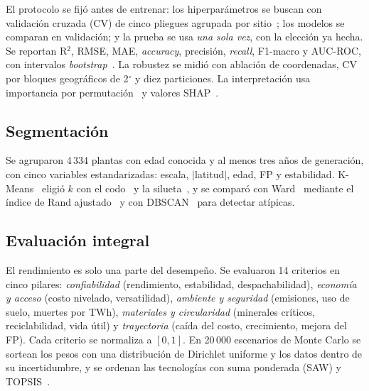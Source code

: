 \documentclass[journal,letterpaper]{IEEEtran}
\begin{document}
El protocolo se fijó antes de entrenar: los hiperparámetros se buscan con validación cruzada (CV) de cinco pliegues agrupada por sitio~\cite{bergstra2012}; los modelos se comparan en validación; y la prueba se usa \emph{una sola vez}, con la elección ya hecha. Se reportan R$^2$, RMSE, MAE, \textit{accuracy}, precisión, \textit{recall}, F1-macro y AUC-ROC, con intervalos \textit{bootstrap}~\cite{efron1993}. La robustez se midió con ablación de coordenadas, CV por bloques geográficos de 2$^\circ$ y diez particiones. La interpretación usa importancia por permutación~\cite{fisher2019} y valores SHAP~\cite{lundberg2017,lundberg2020}.

\subsection{Segmentación}
Se agruparon 4\,334 plantas con edad conocida y al menos tres años de generación, con cinco variables estandarizadas: escala, $|$latitud$|$, edad, FP y estabilidad. K-Means~\cite{lloyd1982} eligió $k$ con el codo~\cite{satopaa2011} y la silueta~\cite{rousseeuw1987}, y se comparó con Ward~\cite{ward1963} mediante el índice de Rand ajustado~\cite{hubert1985} y con DBSCAN~\cite{ester1996} para detectar atípicas.

\subsection{Evaluación integral}
El rendimiento es solo una parte del desempeño. Se evaluaron 14 criterios en cinco pilares: \emph{confiabilidad} (rendimiento, estabilidad, despachabilidad), \emph{economía y acceso} (costo nivelado, versatilidad), \emph{ambiente y seguridad} (emisiones, uso de suelo, muertes por TWh), \emph{materiales y circularidad} (minerales críticos, reciclabilidad, vida útil) y \emph{trayectoria} (caída del costo, crecimiento, mejora del FP). Cada criterio se normaliza a $[0, 1]$. En 20\,000 escenarios de Monte Carlo se sortean los pesos con una distribución de Dirichlet uniforme y los datos dentro de su incertidumbre, y se ordenan las tecnologías con suma ponderada (SAW) y TOPSIS~\cite{hwang1981}.
\end{document}
